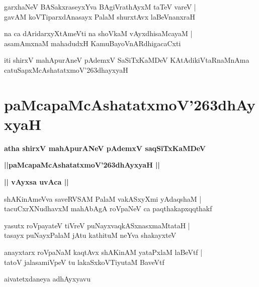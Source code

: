 \documentclass[twoside,12pt,openright]{book}
\def\S{\char'263}
\newcounter{shloka}[chapter]
\def\uvaca#1{\centerline{{\large\textbf{#1}}}}
\begin{document}
\begin{shloka}%
garxhaNeV BASakxraseyxYva BAgiVrathAyxM taTeV vareV |\\
gavAM koVTiparxdAnasayx PalaM shurxtAvx laBeVnanxraH 
\end{shloka}

\begin{shloka}%
na ca dAridarxyXtAmeVti na shoVkaM vAyxdhisaMcayaM |\\
asamAmxnaM mahadudxH KamuBayoVnARdhigacaCxti
\end{shloka}

\begin{center}
iti shirxV mahApurAneV pAdemxV SaSiTxKaMDeV KAtAdikiVtaRnaMnAma catuSapxMcAshatatxmoV\S dhayxyaH
\end{center}

\chapter{paMcapaMcAshatatxmoV\S dhAyxyaH}

\begin{center}
{\LARGE\bfseries atha shirxV mahApurANeV pAdemxV saqSiTxKaMDeV}
\end{center}

\begin{center}
{\LARGE\bfseries ||paMcapaMcAshatatxmoV\S dhAyxyaH || }
\end{center}

\uvaca{|| vAyxsa uvAca ||}

\begin{shloka}%
shAKinAmeVva saveRVSAM PalaM vakASxyXmi yAdaqshaM |\\
tacuCxrXNudhavxM mahAbAgA roVpaNeV ca paqthakapxqqthakf
\end{shloka}

\begin{shloka}%
yasutx roVpayateV tiVreV puNayxvaqkASxnasxmaMtataH |\\
tasayx puNayxPalaM jAtu kathituM neYva shakayxteV
\end{shloka}

\begin{shloka}%
anayxtarx roVpaNaM kaqtAvx shAKinAM yataPxlaM laBeVtf |\\
tatoV jalasamiVpeV tu lakaSxkoVTiyutaM BaveVtf
\end{shloka}

\begin{center}
aivatetxdaneya adhAyxyavu
\end{center}
\end{document}
